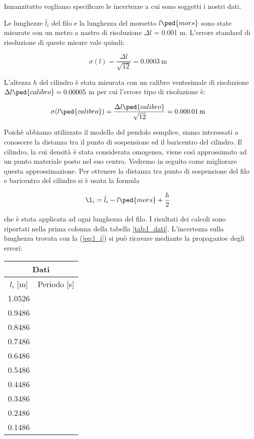 \label{l_medie}

Innanzitutto vogliamo specificare le incertezze a cui sono soggetti i nostri dati.

Le lunghezze $\bar{l}_i$ del filo e la lunghezza del morsetto $l\ped{mors}$ sono state misurate con un metro a nastro di risoluzione
$\Delta l$ = 0.001 m. L'errore standard di risoluzione di queste misure vale quindi:

\begin{equation}
    \sigma(l) = \frac{\Delta l}{\sqrt{12}} = \SI{0.0003}{\metre}
\end{equation}

L'altezza $h$ del cilindro è stata misurata con un calibro ventesimale di risoluzione $\Delta l\ped{calibro} = 0.00005$ m
per cui l'errore tipo di risoluzione è:

\begin{equation}
    \sigma(l\ped{calibro}) = \frac{\Delta l\ped{calibro}}{\sqrt{12}} = \SI{0.00001}{\metre}
\end{equation}

Poichè abbiamo utilizzato il modello del pendolo semplice, siamo interessati a conoscere la distanza tra il punto
di sospensione ed il baricentro del cilindro. Il cilindro, la cui densità è stata considerata omogenea,
viene così approssimato ad un punto materiale posto nel suo centro. Vedremo in seguito come migliorare questa approssimazione.
Per ottenere la distanza tra punto di sospensione del filo e baricentro del cilindro si è usata la formula

\begin{equation}
	\l_i = \bar{l}_i - l\ped{mors} + \frac{h}{2}
    \label{eq:l_i}
\end{equation}

che è stata applicata ad ogni lunghezza del filo. I risultati dei calcoli sono riportati nella prima colonna
della tabella \ref{tab:l_dati}. L'incertezza sulla lunghezza trovata con la (\ref{eq:l_i}) si può ricavare mediante la propagazioe
degli errori:



\begin{SCtable}
    \centering
    \begin{tabular}{c c}
        \multicolumn{2}{c}{\textbf{Dati}} \\
        \toprule
        $l_i$ [m] & Periodo [s] \\
        \midrule
        1.0526 &  \\
        0.9486 &  \\
        0.8486 &  \\
        0.7486 &  \\
        0.6486 &  \\
        0.5486 &  \\
        0.4486 &  \\
        0.3486 &  \\
        0.2486 &  \\
        0.1486 &  \\
        \bottomrule
    \end{tabular}
    \caption{}
    \label{tab:l_dati}
\end{SCtable}
